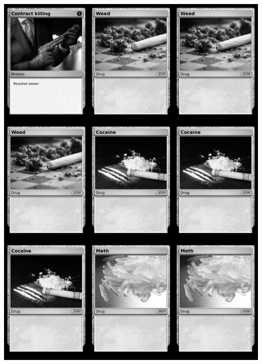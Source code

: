 \documentclass[a4paper]{article}
\begin{document}
\begin{center}
	\centering
	\includegraphics[width=190.5mm,height=266.7mm]{output/temp/page34.png}
\end{center}
\end{document}
